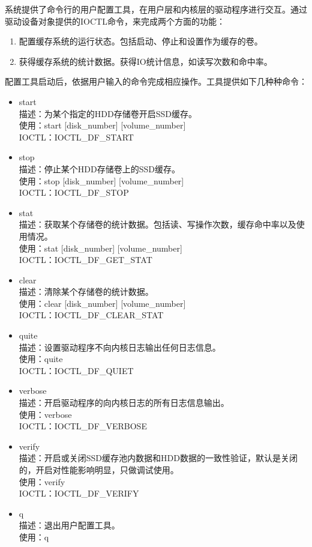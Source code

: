 系统提供了命令行的用户配置工具，在用户层和内核层的驱动程序进行交互。通过驱动设备对象提供的IOCTL命令，来完成两个方面的功能：
\begin{enumerate}
\item 配置缓存系统的运行状态。包括启动、停止和设置作为缓存的卷。
\item 获得缓存系统的统计数据。获得IO统计信息，如读写次数和命中率。
\end{enumerate}

配置工具启动后，依据用户输入的命令完成相应操作。工具提供如下几种种命令：

\begin{itemize}
\item start
\\描述：为某个指定的HDD存储卷开启SSD缓存。
\\使用：start  [disk\_number]  [volume\_number]
\\IOCTL：IOCTL\_DF\_START

\item stop
\\描述：停止某个HDD存储卷上的SSD缓存。
\\使用：stop  [disk\_number]  [volume\_number]
\\IOCTL：IOCTL\_DF\_STOP

\item stat
\\描述：获取某个存储卷的统计数据。包括读、写操作次数，缓存命中率以及使用情况。
\\使用：stat  [disk\_number]  [volume\_number]
\\IOCTL：IOCTL\_DF\_GET\_STAT

\item clear
\\描述：清除某个存储卷的统计数据。
\\使用：clear  [disk\_number]  [volume\_number]
\\IOCTL：IOCTL\_DF\_CLEAR\_STAT

\item quite
\\描述：设置驱动程序不向内核日志输出任何日志信息。
\\使用：quite
\\IOCTL：IOCTL\_DF\_QUIET

\item verbose
\\描述：开启驱动程序的向内核日志的所有日志信息输出。
\\使用：verbose
\\IOCTL：IOCTL\_DF\_VERBOSE

\item verify
\\描述：开启或关闭SSD缓存池内数据和HDD数据的一致性验证，默认是关闭的，开启对性能影响明显，只做调试使用。
\\使用：verify
\\IOCTL：IOCTL\_DF\_VERIFY

\item q
\\描述：退出用户配置工具。
\\使用：q
\end{itemize}

